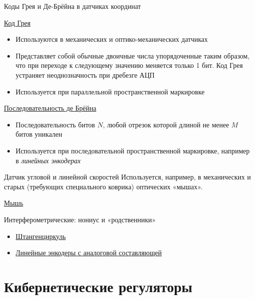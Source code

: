 \documentclass[xetex,aspectratio=43]{beamer}
\begin{document}
\begin{frame}{Коды Грея и Де-Брёйна в датчиках координат}

\begin{block}{\href{https://en.wikipedia.org/wiki/Gray_code}{Код Грея}}
\begin{itemize}
\tightlist
\item Используются в механических и оптико-механических датчиках
\item Представляет собой обычные двоичные числа упорядоченные таким образом, что при переходе к следующему значению меняется только 1 бит. Код Грея устраняет неоднозначность при дребезге АЦП
\item Используется при параллельной пространственной маркировке
\end{itemize}
\end{block}

\begin{block}{\href{https://en.wikipedia.org/wiki/De_Bruijn_sequence}{Последовательность де Брёйна}}
\begin{itemize}
\tightlist
\item Последовательность битов $N$, любой отрезок которой длиной не менее $M$ битов уникален
\item Используется при последовательной пространственной маркировке, например в \emph{линейных энкодерах}
\end{itemize}
\end{block}

\end{frame}

\begin{frame}{Датчик угловой и линейной скоростей}
Используется, например, в механических и старых (требующих специального коврика) оптических «мышах».

\href{https://en.wikipedia.org/wiki/Computer_mouse\#Mechanical_mice}{Мышь}
\end{frame}

\begin{frame}{Интерферометрические: нониус и «родственники»}
  \begin{itemize}
  \item \href{https://en.wikipedia.org/wiki/Vernier_scale\#Functioning}{Штангенциркуль}
  \item \href{https://skbis.ru/catalog}{Линейные энкодеры с аналоговой составляющей}
  \end{itemize}
\end{frame}

\hypertarget{cybcontrollers}{\section{Кибернетические регуляторы}}
\end{document}
